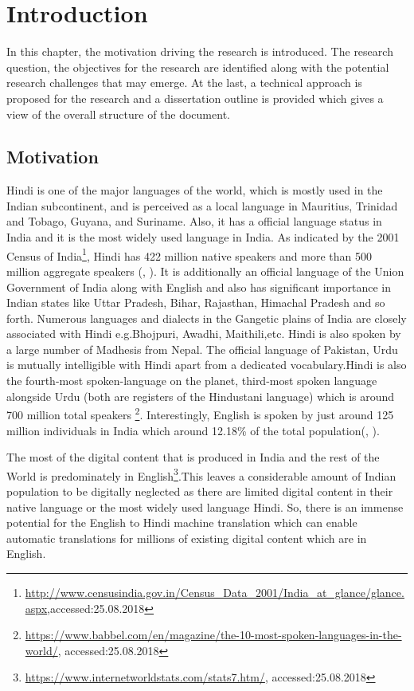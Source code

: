 
\chapter{Introduction}
In this chapter, the motivation driving the research is introduced. The research question, the objectives for the research are identified along with the potential research challenges that may emerge. At the last, a technical approach is proposed for the research and a dissertation outline is provided which gives a view of the overall structure of the document.
\section{Motivation}
Hindi is one of the major languages of the world, which is mostly used in the Indian subcontinent, and is perceived as a local language in Mauritius, Trinidad and Tobago, Guyana, and Suriname. Also, it has a official language status in India and it is the most widely used language in India. As indicated by the 2001 Census of India\footnote{\url{http://www.censusindia.gov.in/Census_Data_2001/India_at_glance/glance.aspx},accessed:25.08.2018}, Hindi has 422 million native speakers and more than 500 million aggregate speakers (\citeauthor{ wiki:hindi}, \citeyear{ wiki:hindi}). It is additionally an official language of the Union Government of India along with English and also has significant importance in Indian states like Uttar Pradesh, Bihar, Rajasthan, Himachal Pradesh and so forth. Numerous languages and dialects in the Gangetic plains of India are closely associated with Hindi e.g.Bhojpuri, Awadhi, Maithili,etc. Hindi is also spoken by a large number of Madhesis from Nepal. The official language of Pakistan, Urdu is mutually intelligible with Hindi apart from a dedicated vocabulary.Hindi is also the fourth-most spoken-language on the planet, third-most spoken language alongside Urdu (both are registers of the Hindustani language) which is around 700 million total speakers \footnote{\url{https://www.babbel.com/en/magazine/the-10-most-spoken-languages-in-the-world/},    accessed:25.08.2018}. Interestingly, English is spoken by just around 125 million individuals  in India which around 12.18\% of the total population(\citeauthor{ wiki:english}, \citeyear{ wiki:english}).  


The most of the digital content that is produced in India and the rest of the World is predominately in English\footnote{\url{https://www.internetworldstats.com/stats7.htm/}, accessed:25.08.2018}.This leaves a considerable amount of Indian population to be digitally neglected as there are limited digital content in their native language or the most widely used language Hindi. So, there is an immense potential for the English to Hindi machine translation which  can enable automatic translations for millions of existing digital content which are in English. 


